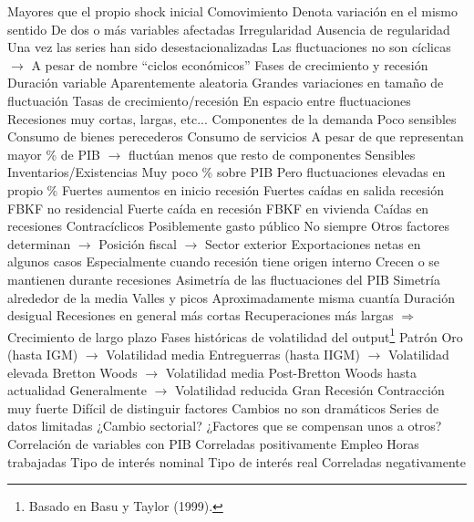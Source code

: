 \documentclass{nuevotema}
\begin{document}
\begin{esquemal}
				\4[] Mayores que el propio shock inicial
				\4 Comovimiento
				\4[] Denota variación en el mismo sentido
				\4[] De dos o más variables afectadas
		\2 Irregularidad
			\3 Ausencia de regularidad
				\4 Una vez las series han sido desestacionalizadas
				\4[] Las fluctuaciones no son cíclicas
				\4[] $\to$ A pesar de nombre ``ciclos económicos''
				\4 Fases de crecimiento y recesión
				\4[] Duración variable
				\4[] Aparentemente aleatoria
			\3 Grandes variaciones en tamaño de fluctuación
				\4[] Tasas de crecimiento/recesión
				\4 En espacio entre fluctuaciones
				\4[] Recesiones muy cortas, largas, etc...
		\2 Componentes de la demanda
			\3 Poco sensibles
				\4 Consumo de bienes perecederos
				\4 Consumo de servicios
				\4 A pesar de que representan mayor \% de PIB
				\4[] $\to$ fluctúan menos que resto de componentes
			\3 Sensibles
				\4 Inventarios/Existencias
				\4[] Muy poco \% sobre PIB
				\4[] Pero fluctuaciones elevadas en propio \%
				\4[] Fuertes aumentos en inicio recesión
				\4[] Fuertes caídas en salida recesión
				\4 FBKF no residencial
				\4[] Fuerte caída en recesión
				\4 FBKF en vivienda
				\4[] Caídas en recesiones
			\3 Contracíclicos
				\4 Posiblemente gasto público
				\4[] No siempre
				\4[] Otros factores determinan
				\4[] $\to$ Posición fiscal
				\4[] $\to$ Sector exterior
				\4 Exportaciones netas en algunos casos
				\4[] Especialmente cuando recesión tiene origen interno
				\4[$\to$] Crecen o se mantienen durante recesiones
		\2 Asimetría de las fluctuaciones del PIB
			\3 Simetría alrededor de la media
				\4 Valles y picos
				\4[] Aproximadamente misma cuantía
			\3 Duración desigual
				\4 Recesiones en general más cortas
				\4 Recuperaciones más largas
				\4[] $\Rightarrow$ Crecimiento de largo plazo
		\2 Fases históricas de volatilidad del output\footnote{Basado en Basu y Taylor (1999).}
			\3 Patrón Oro (hasta IGM)
				\4[] $\to$ Volatilidad media
			\3 Entreguerras (hasta IIGM)
				\4[] $\to$ Volatilidad elevada
			\3 Bretton Woods
				\4[] $\to$ Volatilidad media
			\3 Post-Bretton Woods hasta actualidad
				\4 Generalmente
				\4[] $\to$ Volatilidad reducida
				\4 Gran Recesión
				\4[] Contracción muy fuerte
			\3 Difícil de distinguir factores
				\4 Cambios no son dramáticos
				\4 Series de datos limitadas
				\4 ¿Cambio sectorial?
				\4 ¿Factores que se compensan unos a otros?
		\2 Correlación de variables con PIB
			\3 Correladas positivamente
				\4[] Empleo
				\4[] Horas trabajadas
				\4[] Tipo de interés nominal
				\4[] Tipo de interés real
			\3 Correladas negativamente

\end{esquemal}
\end{document}
